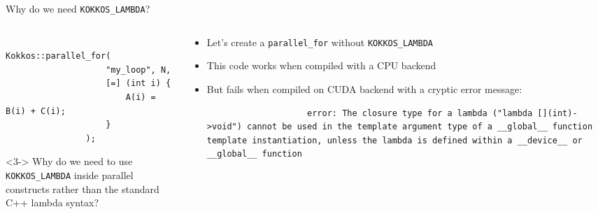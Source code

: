 \documentclass[
    aspectratio=169,
    \createHandout
]{beamer}
\begin{document}
\begin{frame}[fragile]{Why do we need \texttt{KOKKOS\_LAMBDA}?}
    \begin{columns}
        \begin{column}{0.4\linewidth}
            \begin{verbatim}
                Kokkos::parallel_for(
                    "my_loop", N,
                    [=] (int i) {
                        A(i) = B(i) + C(i);
                    }
                );
            \end{verbatim}
            \begin{uncoverenv}<3->
                 Why do we need to use \texttt{KOKKOS\_LAMBDA} inside parallel constructs rather than the standard C++ lambda syntax?
            \end{uncoverenv}
        \end{column}
        \begin{column}{0.6\linewidth}
            \begin{itemize}
                \item Let's create a \texttt{parallel\_for} without \texttt{KOKKOS\_LAMBDA}
                \item This code works when compiled with a CPU backend
                \pause
                \item But fails when compiled on CUDA backend with a cryptic error message:
                \begin{verbatim}
                    error: The closure type for a lambda ("lambda [](int)->void") cannot be used in the template argument type of a __global__ function template instantiation, unless the lambda is defined within a __device__ or __global__ function
                \end{verbatim}
            \end{itemize}
        \end{column}
    \end{columns}
\end{frame}

\end{document}
